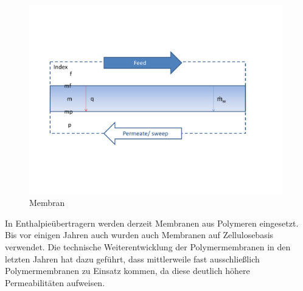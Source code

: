 \begin{figure} [h]
	\centering
	\includegraphics[width=0.98\textwidth]{pictures/Membran.pdf}
	\caption{Membran}
	\label{Membran}
\end{figure}

In Enthalpieübertragern werden derzeit Membranen aus Polymeren eingesetzt. Bis vor einigen Jahren auch wurden auch Membranen auf Zellulosebasis verwendet. Die technische Weiterentwicklung der Polymermembranen in den letzten Jahren hat dazu geführt, dass mittlerweile fast ausschließlich Polymermembranen zu Einsatz kommen, da diese deutlich höhere Permeabilitäten aufweisen. \cite{JingchunMin.}








